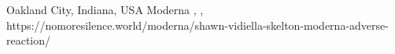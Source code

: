           {Oakland City, Indiana, USA}
          {}
          {Moderna}
          {}
          {
            ,
            ,
          }
          {https://nomoresilence.world/moderna/shawn-vidiella-skelton-moderna-adverse-reaction/}


